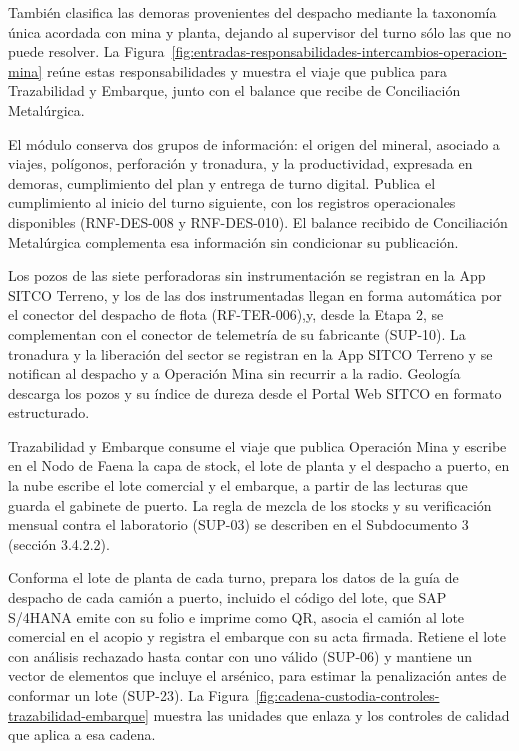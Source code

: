 \documentclass[subdoc]{../../comun/overfore}
\begin{document}
También clasifica las demoras provenientes del despacho mediante la taxonomía única acordada con mina y planta, dejando al supervisor del turno sólo las que no puede resolver. La Figura~\ref{fig:entradas-responsabilidades-intercambios-operacion-mina} reúne estas responsabilidades y muestra el viaje que publica para Trazabilidad y Embarque, junto con el balance que recibe de Conciliación Metalúrgica.

\begin{horizontal}
\end{horizontal}
El módulo conserva dos grupos de información: el origen del mineral, asociado a viajes, polígonos, perforación y tronadura, y la productividad, expresada en demoras, cumplimiento del plan y entrega de turno digital. Publica el cumplimiento al inicio del turno siguiente, con los registros operacionales disponibles (RNF-DES-008 y RNF-DES-010). El balance recibido de Conciliación Metalúrgica complementa esa información sin condicionar su publicación.

Los pozos de las siete perforadoras sin instrumentación se registran en la App SITCO Terreno, y los de las dos instrumentadas llegan en forma automática por el conector del despacho de flota (RF-TER-006),y, desde la Etapa 2, se complementan con el conector de telemetría de su fabricante (SUP-10). La tronadura y la liberación del sector se registran en la App SITCO Terreno y se notifican al despacho y a Operación Mina sin recurrir a la radio. Geología descarga los pozos y su índice de dureza desde el Portal Web SITCO en formato estructurado.

Trazabilidad y Embarque consume el viaje que publica Operación Mina y escribe en el Nodo de Faena la capa de stock, el lote de planta y el despacho a puerto, en la nube escribe el lote comercial y el embarque, a partir de las lecturas que guarda el gabinete de puerto. La regla de mezcla de los stocks y su verificación mensual contra el laboratorio (SUP-03) se describen en el Subdocumento 3 (sección 3.4.2.2).

Conforma el lote de planta de cada turno, prepara los datos de la guía de despacho de cada camión a puerto, incluido el código del lote, que SAP S/4HANA emite con su folio e imprime como QR, asocia el camión al lote comercial en el acopio y registra el embarque con su acta firmada. Retiene el lote con análisis rechazado hasta contar con uno válido (SUP-06) y mantiene un vector de elementos que incluye el arsénico, para estimar la penalización antes de conformar un lote (SUP-23). La Figura~\ref{fig:cadena-custodia-controles-trazabilidad-embarque} muestra las unidades que enlaza y los controles de calidad que aplica a esa cadena.
\end{document}
